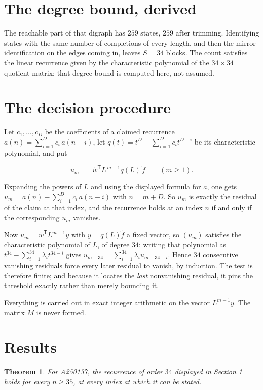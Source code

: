 \documentclass[11pt]{article}
\newtheorem{theorem}{Theorem}
\theoremstyle{definition}
\begin{document}
\section{The degree bound, derived}

The reachable part of that digraph has $259$ states, $259$ after trimming. Identifying states with the same number of completions of every length, and then the mirror identification on the edges coming in, leaves $S = 34$ blocks. The count satisfies the linear recurrence given by the characteristic polynomial of the $34\times34$ quotient matrix; that degree bound is computed here, not assumed.

\section{The decision procedure}

Let $c_1,\dots,c_D$ be the coefficients of a claimed recurrence $a(n) = \sum_{i=1}^{D} c_i\,a(n-i)$, let $q(t) = t^{D} - \sum_{i=1}^{D} c_i t^{D-i}$ be its characteristic polynomial, and put

\[u_m \;=\; \tilde w^{\mathsf T} L^{\,m-1} q(L)\,\tilde f \qquad (m \ge 1).\]

Expanding the powers of $L$ and using the displayed formula for $a$, one gets $u_m = a(n) - \sum_{i=1}^{D} c_i\,a(n-i)$ with $n = m + D$. So $u_m$ is exactly the residual of the claim at that index, and the recurrence holds at an index $n$ if and only if the corresponding $u_m$ vanishes.

Now $u_m = \tilde w^{\mathsf T} L^{m-1} y$ with $y = q(L)\tilde f$ a fixed vector, so $(u_m)$ satisfies the characteristic polynomial of $L$, of degree $34$: writing that polynomial as $t^{34} - \sum_{i=1}^{34} \lambda_i t^{34-i}$ gives $u_{m+34} = \sum_{i=1}^{34} \lambda_i u_{m+34-i}$. Hence $34$ consecutive vanishing residuals force every later residual to vanish, by induction. The test is therefore finite; and because it locates the {\itshape last} nonvanishing residual, it pins the threshold exactly rather than merely bounding it.

Everything is carried out in exact integer arithmetic on the vector $L^{m-1}y$. The matrix $M$ is never formed.

\section{Results}

\begin{theorem} For A250137, the recurrence of order $34$ displayed in Section 1 holds for every $n \ge 35$, at every index at which it can be stated.\end{theorem}
\end{document}
